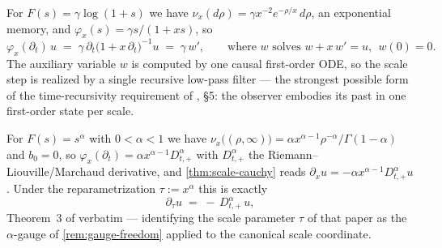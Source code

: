 \begin{example}\label{ex:gamma-recursive}
For $F(s) = \gamma\log(1+s)$ we have $\nu_x(d\rho) = \gamma x^{-2} e^{-\rho/x}\,d\rho$, an
exponential memory, and $\varphi_x(s) = \gamma s/(1 + xs)$, so
\[
  \varphi_x(\partial_t)\,u \;=\; \gamma\,\partial_t\bigl(1 + x\,\partial_t\bigr)^{-1} u
  \;=\; \gamma\, w', \qquad \text{where } w \text{ solves } w + x\,w' = u,\ \ w(0) = 0 .
\]
The auxiliary variable $w$ is computed by one causal first-order ODE, so the scale step is
realized by a single recursive low-pass filter --- the strongest possible form of the
time-recursivity requirement of , \S5: the observer embodies
its past in one first-order state per scale.
\end{example}

\begin{remark}\label{rem:recovering-thm3}
For $F(s) = s^\alpha$ with $0 < \alpha < 1$ we have
$\nu_x\bigl((\rho,\infty)\bigr) = \alpha x^{\alpha-1}\rho^{-\alpha}/\Gamma(1-\alpha)$ and
$b_0 = 0$, so $\varphi_x(\partial_t) = \alpha x^{\alpha - 1} D^{\alpha}_{t,+}$ with
$D^{\alpha}_{t,+}$ the Riemann--Liouville/Marchaud derivative, and \ref{thm:scale-cauchy} reads
$\partial_x u = -\alpha x^{\alpha-1} D^{\alpha}_{t,+} u$. Under the reparametrization
$\tau := x^{\alpha}$ this is exactly
\[
  \partial_\tau u \;=\; -\,D^{\alpha}_{t,+}\, u,
\]
Theorem~3 of  verbatim --- identifying the scale parameter
$\tau$ of that paper as the $\alpha$-gauge of \ref{rem:gauge-freedom} applied to the canonical
scale coordinate.
\end{remark}

